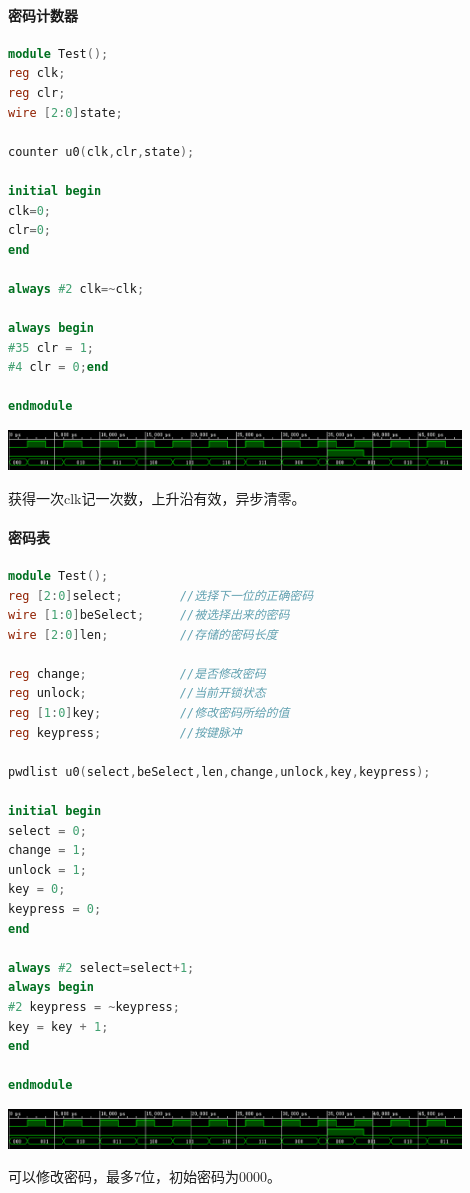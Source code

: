 \documentclass[a4paper,11pt]{ctexart}
\begin{document}
\paragraph{密码计数器}
\begin{lstlisting}[language={verilog}]
module Test();
reg clk;
reg clr;
wire [2:0]state;

counter u0(clk,clr,state);

initial begin
clk=0;
clr=0;
end

always #2 clk=~clk;

always begin
#35 clr = 1;
#4 clr = 0;end

endmodule
\end{lstlisting}
\includegraphics[width=0.9\textwidth]{./images/sim3.eps}

获得一次clk记一次数，上升沿有效，异步清零。

\paragraph{密码表}
\begin{lstlisting}[language={verilog}]
module Test();
reg [2:0]select;        //选择下一位的正确密码
wire [1:0]beSelect;     //被选择出来的密码
wire [2:0]len;          //存储的密码长度

reg change;             //是否修改密码
reg unlock;             //当前开锁状态
reg [1:0]key;           //修改密码所给的值
reg keypress;           //按键脉冲

pwdlist u0(select,beSelect,len,change,unlock,key,keypress);

initial begin
select = 0;
change = 1;
unlock = 1;
key = 0;
keypress = 0;
end

always #2 select=select+1;
always begin
#2 keypress = ~keypress;
key = key + 1;
end

endmodule
\end{lstlisting}
\includegraphics[width=0.9\textwidth]{./images/sim3.eps}

可以修改密码，最多7位，初始密码为0000。
\end{document}
